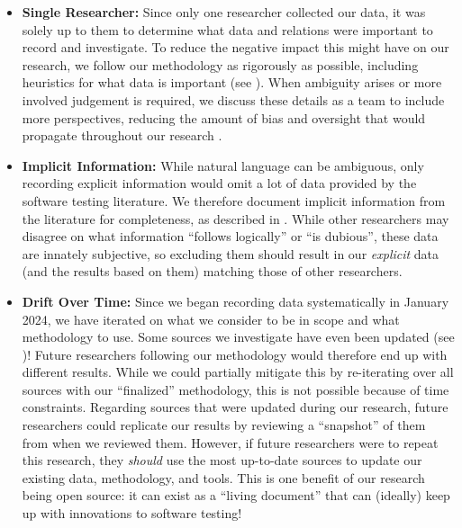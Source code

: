 \begin{itemize}
    \item \textbf{Single Researcher:} Since only one researcher collected our
          data, it was solely up to them to determine what data
          and relations were important to record and investigate. To reduce the
          negative impact this might have on our research, we follow our
          methodology as rigorously as possible, including heuristics
          for what data is important (see ). When ambiguity
          arises or more involved judgement is required, we discuss these
          details as a team to include more perspectives, reducing the amount
          of bias and oversight that would propagate throughout our research%
          .

    \item \textbf{Implicit Information:} While natural language can be
          ambiguous, only recording explicit information would omit a lot of
          data provided by the software testing literature. We therefore
          document implicit information from the
          literature for completeness, as described in . While
          other researchers may disagree on what information ``follows
          logically'' or ``is dubious'', these data are innately subjective,
          so excluding them should result in our \emph{explicit} data (and
          the results based on them) matching those of other researchers.

    \item \textbf{Drift Over Time:} Since we began recording data
          systematically in January 2024, we have
          iterated on what we consider to be in scope and what methodology to
          use. Some sources we investigate have even been updated (see
          )! Future researchers following our methodology
          would therefore end up with different results. While we could
          partially mitigate this by re-iterating over all sources with our
          ``finalized'' methodology, this is not possible because of time
          constraints. Regarding sources that were updated during
          our research, future researchers could replicate our results by
          reviewing a ``snapshot'' of them from when we reviewed them. However, if future
          researchers were to repeat this research, they \emph{should} use the
          most up-to-date sources to update our existing data, methodology, and
          tools. This is one benefit of our research being open source:
          it can exist as a ``living document'' that can (ideally) keep up with
          innovations to software testing!
\end{itemize}

